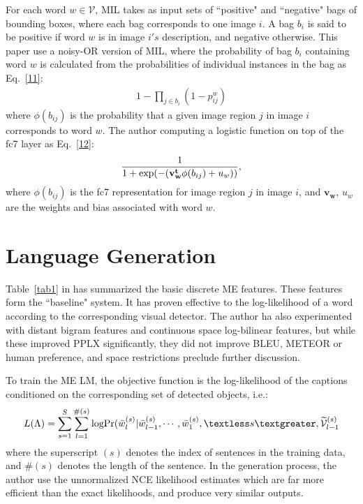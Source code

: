 \documentclass[10pt,twocolumn,letterpaper]{article}
\begin{document}
For each word $w\in\mathcal{V}$, MIL takes as input sets of ``positive" and ``negative" bags of bounding boxes, where each bag corresponds to one image $i$. A bag $b_i$ is said to be positive if word $w$ is in image $i's$ description, and negative otherwise. This paper use a noisy-OR version of MIL, where the probability of bag $b_i$ containing word $w$ is calculated from the probabilities of individual instances in the bag as Eq.~\ref{11}\cite{Fang2015From}:
\begin{equation}\label{11}
\begin{split}
1-\prod_{j\in b_i}(1-p_{ij}^{w})
\end{split}
\end{equation}
where $\phi(b_{ij})$ is the probability that a given image region $j$ in image $i$ corresponds to word $w$. The author computing a logistic function on top of the fc7 layer as Eq.~\ref{12}\cite{Fang2015From}:
\begin{equation}\label{12}
\begin{split}
\frac{1}{1+{\rm exp(-(}\mathbf{v^t_w}\phi(b_{ij})+u_w))},
\end{split}
\end{equation}
where $\phi(b_{ij})$ is the fc7 representation for image region $j$ in image $i$, and $\mathbf{v_w}$, $u_w$ are the weights and bias associated with word $w$.
\section{Language Generation}
Table~\ref{tab1} in\cite{Fang2015From} has summarized the basic discrete ME features. These features form the ``baseline" system. It has proven effective to the log-likelihood of a word according to the corresponding visual detector. The author ha also experimented with distant bigram features and continuous space log-bilinear features, but while these improved PPLX significantly, they did not improve BLEU, METEOR or human preference, and space restrictions preclude further discussion.
\par
To train the ME LM, the objective function is the log-likelihood of the captions conditioned on the corresponding set of detected objects, i.e.:
\begin{equation}\label{12}
\begin{split}
L(\Lambda)=\sum_{s=1}^{S}\sum_{l=1}^{\#(s)}{\rm logPr}(\bar{w}_l^{(s)}|\bar{w}_{l-1}^{(s)},\cdots,\bar{w}_1^{(s)},\textless s \textgreater,\mathcal{\widetilde{V}}_{l-1}^{(s)}
\end{split}
\end{equation}
where the superscript $(s)$ denotes the index of sentences in the training data, and $\#(s)$ denotes the length of the sentence. In the generation process, the author use the unnormalized NCE likelihood estimates which are far more efficient than the exact likelihoods, and produce very similar outputs.
{\small


}
\end{document}
